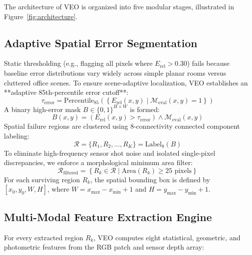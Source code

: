\documentclass[11pt,a4paper]{article}
\begin{document}
The architecture of VEO is organized into five modular stages, illustrated in Figure~\ref{fig:architecture}.

\subsection{Adaptive Spatial Error Segmentation}
\label{sec:segmentation}
Static thresholding (e.g., flagging all pixels where $E_{\mathrm{rel}} > 0.30$) fails because baseline error distributions vary widely across simple planar rooms versus cluttered office scenes. To ensure scene-adaptive localization, VEO establishes an **adaptive 85th-percentile error cutoff**:
\begin{equation}
\label{eq:percentile_thresh}
\tau_{\mathrm{error}} = \text{Percentile}_{85}\left( \left\{ E_{\mathrm{rel}}(x,y) \mid \mathcal{M}_{\mathrm{eval}}(x,y) = 1 \right\} \right)
\end{equation}
A binary high-error mask $B \in \{0, 1\}^{H \times W}$ is formed:
\begin{equation}
\label{eq:binary_mask}
B(x,y) = \left( E_{\mathrm{rel}}(x,y) > \tau_{\mathrm{error}} \right) \land \mathcal{M}_{\mathrm{eval}}(x,y)
\end{equation}
Spatial failure regions are clustered using 8-connectivity connected component labeling:
\begin{equation}
\label{eq:connected_components}
\mathcal{R} = \{ R_1, R_2, \dots, R_K \} = \text{Label}_{8}(B)
\end{equation}
To eliminate high-frequency sensor shot noise and isolated single-pixel discrepancies, we enforce a morphological minimum area filter:
\begin{equation}
\label{eq:area_filter}
\mathcal{R}_{\mathrm{filtered}} = \left\{ R_k \in \mathcal{R} \mid \text{Area}(R_k) \ge 25 \text{ pixels} \right\}
\end{equation}
For each surviving region $R_k$, the spatial bounding box is defined by $[x_0, y_0, W, H]$, where $W = x_{\max} - x_{\min} + 1$ and $H = y_{\max} - y_{\min} + 1$.

\subsection{Multi-Modal Feature Extraction Engine}
\label{sec:features}
For every extracted region $R_k$, VEO computes eight statistical, geometric, and photometric features from the RGB patch and sensor depth array:
\end{document}
